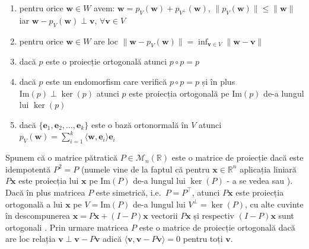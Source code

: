 \documentclass[]{article}
\begin{document}
\begin{enumerate}
\def\labelenumi{\roman{enumi})}
\item
  pentru orice \(\boldsymbol w\in W\) avem:
  \(\boldsymbol w = p_V(\boldsymbol w) + p_{V^\perp}(\boldsymbol w)\),
  \(\lVert p_V(\boldsymbol w)\rVert \leq \lVert \boldsymbol w\rVert\)
  iar \(\boldsymbol w - p_{V}(\boldsymbol w) \perp \boldsymbol v\),
  \(\forall \boldsymbol v \in V\)
\item
  pentru orice \(\boldsymbol w\in W\) are loc
  \(\lVert \boldsymbol w - p_V(\boldsymbol w)\rVert = \inf_{\boldsymbol v\in V}\lVert \boldsymbol w - \boldsymbol v\rVert\)
\item
  dacă \(p\) este o proiecție ortogonală atunci \(p\circ p = p\)
\item
  dacă \(p\) este un endomorfism care verifică \(p\circ p = p\) și în
  plus \(\textrm{Im}(p)\perp \ker(p)\) atunci \(p\) este proiecția
  ortogonală pe \(\textrm{Im}(p)\) de-a lungul lui \(\ker(p)\)
\item
  dacă \(\{\boldsymbol e_1, \boldsymbol e_2, \ldots, \boldsymbol e_k\}\)
  este o bază ortonormală în \(V\) atunci
  \(p_V(\boldsymbol w) = \sum_{i = 1}^{k}\langle \boldsymbol w, \boldsymbol e_i\rangle \boldsymbol e_i\)
\end{enumerate}

Spunem că o matrice pătratică \(P\in\mathcal{M}_{n}(\mathbb{R})\) este o
matrice de proiecție dacă este idempotentă \(P^2 = P\) (numele vine de
la faptul că pentru \(\boldsymbol x\in\mathbb{R}^n\) aplicația liniară
\(P\boldsymbol x\) este proiecția lui \(\boldsymbol x\) pe
\(\mathrm{Im}(P)\) de-a lungul lui \(\ker(P)\) - a se vedea
\citep[Capitolul 1, Secțiunea 5.2]{Turtoi2000} sau \citep[Capitolul
2]{Yanai2011}). Dacă în plus matricea \(P\) este simetrică,
i.e.~\(P = P^\intercal\), atunci \(P\boldsymbol x\) este proiecția
ortogonală a lui \(\boldsymbol x\) pe \(V = \mathrm{Im}(P)\) de-a lungul
lui \(V^\perp = \ker(P)\), cu alte cuvinte în descompunerea
\(\boldsymbol x = P\boldsymbol x + (I - P)\boldsymbol x\) vectorii
\(P\boldsymbol x\) și respectiv \((I - P)\boldsymbol x\) sunt ortogonali
\citep[Capitolul 2, Secțiunea 2.2]{Yanai2011}. Prin urmare matricea
\(P\) este o matrice de proiecție ortogonală dacă are loc relația
\(\boldsymbol v\perp \boldsymbol v - P\boldsymbol v\) adică
\(\langle\boldsymbol v, \boldsymbol v - P\boldsymbol v\rangle = 0\)
pentru toți \(\boldsymbol v\).
\end{document}

